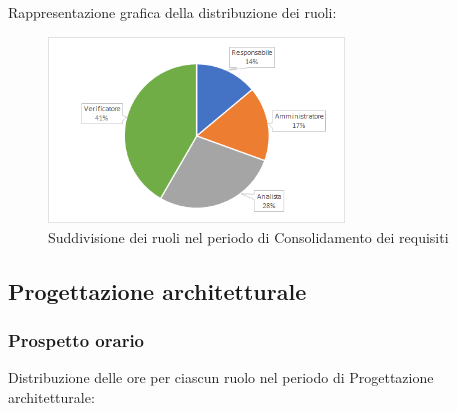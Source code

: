 		Rappresentazione grafica della distribuzione dei ruoli:
		\begin{figure}[h]
			\centering
			\includegraphics[width=0.7\textwidth]{./res/img/consolidamentoRequisiti_pe.png}
			\caption{Suddivisione dei ruoli nel periodo di Consolidamento dei requisiti}
		\end{figure}

\newpage	
\subsection{Progettazione architetturale}
	\subsubsection{Prospetto orario}
		Distribuzione delle ore per ciascun ruolo nel periodo di Progettazione architetturale:
		
